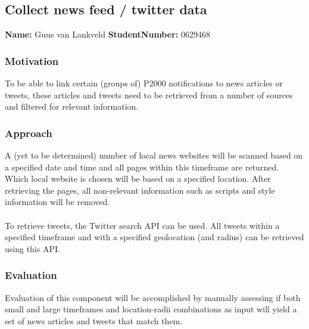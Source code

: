 \subsection{Collect news feed /  twitter data}
\textbf{Name:} Guus van Lankveld \indent \textbf{StudentNumber:} 0629468

\subsubsection*{Motivation}
To be able to link certain (groups of) P2000 notifications to news articles or tweets, these articles and tweets need to be retrieved from a number of sources and filtered for relevant information.

\subsubsection*{Approach}
A (yet to be determined) number of local news websites will be scanned based on a specified date and time and all pages within this timeframe are returned. Which local website is chosen will be based on a specified location. After retrieving the pages, all non-relevant information such as scripts and style information will be removed.\\\\
To retrieve tweets, the Twitter search API can be used. All tweets within a specified timeframe and with a specified geolocation (and radius) can be retrieved using this API.

\subsubsection*{Evaluation }
Evaluation of this component will be accomplished by manually assessing if both small and large timeframes and location-radii combinations as input will yield a set of news articles and tweets that match them.